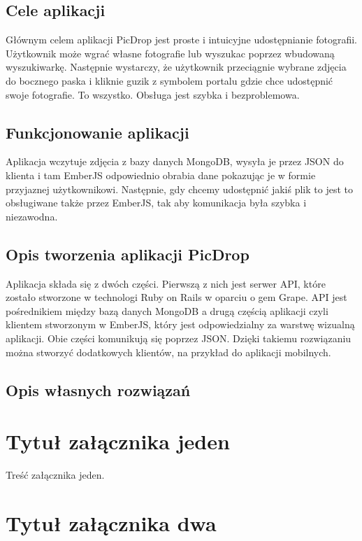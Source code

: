 \documentclass[brudnopis]{xmgr}
\begin{document}
\section{Cele aplikacji}

Głównym celem aplikacji PicDrop jest proste i intuicyjne udostępnianie fotografii. Użytkownik może wgrać własne fotografie lub wyszukac poprzez wbudowaną wyszukiwarkę. Następnie wystarczy, że użytkownik przeciągnie wybrane zdjęcia do bocznego paska i kliknie guzik z symbolem portalu gdzie chce udostępnić swoje fotografie. To wszystko. Obsługa jest szybka i bezproblemowa. 

\section{Funkcjonowanie aplikacji}

Aplikacja wczytuje zdjęcia z bazy danych MongoDB, wysyła je przez JSON do klienta i tam EmberJS odpowiednio obrabia dane pokazując je w formie przyjaznej użytkownikowi. Następnie, gdy chcemy udostępnić jakiś plik to jest to obsługiwane także przez EmberJS, tak aby komunikacja była szybka i niezawodna. 

\section{Opis tworzenia aplikacji PicDrop}

Aplikacja składa się z dwóch części. Pierwszą z nich jest serwer API, które zostało stworzone w technologi Ruby on Rails w oparciu o gem Grape. API jest pośrednikiem między bazą danych MongoDB a drugą częścią aplikacji czyli klientem stworzonym w EmberJS, który jest odpowiedzialny za warstwę wizualną aplikacji. Obie części komunikują się poprzez  JSON. Dzięki takiemu rozwiązaniu można stworzyć dodatkowych klientów, na przykład do aplikacji mobilnych.

\section{Opis własnych rozwiązań}   

\summary

\appendix
\chapter{Tytuł załącznika jeden}

Treść załącznika jeden.
\chapter{Tytuł załącznika dwa}
\end{document}
